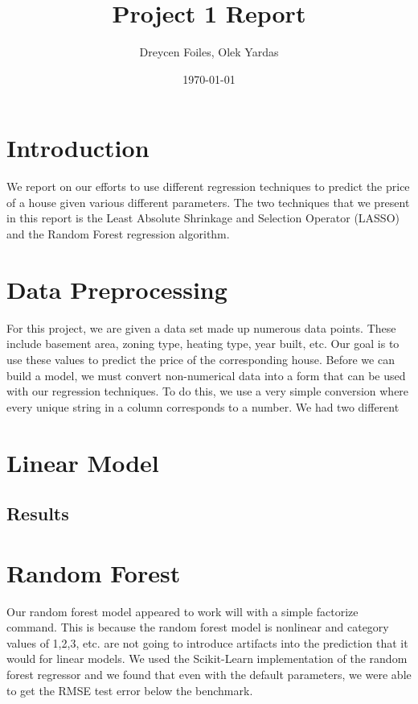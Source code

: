 \documentclass{article}
\title{Project 1 Report}
\author{Dreycen Foiles, Olek Yardas}
\date{\today}
\begin{document}
\maketitle

\section{Introduction}

We report on our efforts to use different regression techniques to predict the price of a house given various different parameters. The two techniques that we present in this report is the Least Absolute Shrinkage and Selection Operator (LASSO) and the Random Forest regression algorithm.

\section{Data Preprocessing}

For this project, we are given a data set made up numerous data points. These include basement area, zoning type, heating type, year built, etc. Our goal is to use these values to predict the price of the corresponding house. Before we can build a model, we must convert non-numerical data into a form that can be used with our regression techniques. To do this, we use a very simple conversion where every unique string in a column corresponds to a number. We had two different 

\section{Linear Model}

\subsection{Results}

\section{Random Forest}

Our random forest model appeared to work will with a simple factorize command. This is because the random forest model is nonlinear and category values of 1,2,3, etc. are not going to introduce artifacts into the prediction that it would for linear models. We used the Scikit-Learn implementation of the random forest regressor and we found that even with the default parameters, we were able to get the RMSE test error below the benchmark.
\end{document}
